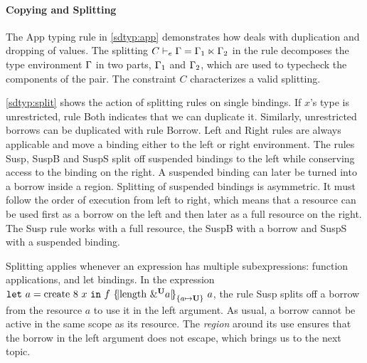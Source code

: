 \paragraph{Copying and Splitting}
\label{sdtyping:split}

The {\sc App} typing rule in \cref{sdtyp:app} demonstrates how \lang
deals with duplication and dropping of values.
The splitting $C \vdash_e \Gamma = \Gamma_1 \ltimes \Gamma_2$ in the rule decomposes the
type environment $\Gamma$ in two parts, $\Gamma_1$ and $\Gamma_2$, which are used
to typecheck the components of the pair.
The constraint $C$ characterizes a valid  splitting.

\cref{sdtyp:split} shows the action of splitting rules on single
bindings. If $x$'s type is unrestricted, 
rule {\sc Both} indicates that we can duplicate it.
Similarly, unrestricted borrows can be duplicated with rule
{\sc Borrow}.
{\sc Left} and {\sc Right} rules are always applicable and move a binding
either to the left or right environment.
The rules {\sc Susp}, {\sc SuspB} and {\sc SuspS}
split off suspended bindings to
the left while conserving access to the binding on the right.
A suspended binding can later be turned
into a borrow inside a region. Splitting of suspended bindings is
asymmetric. It must follow the order of execution from left to right,
which means that a resource can be used first as a borrow on the left
and then later as a full resource on the right. The {\sc Susp} rule
works with a full resource, the {\sc SuspB}
with a borrow and {\sc SuspS} with a suspended binding.

Splitting applies whenever an
expression has multiple subexpressions:  function applications,
and let bindings. In the
expression
$\letin{a}{\text{create}\ 8\ x}
{f\ \region[{}]{\Sone a\IBORROW}{\text{length}\ \borrow[\IBORROW]{a}}\ a}$,
the rule {\sc Susp} splits off a borrow from  the resource
$a$ to use it in the left argument.
As usual, a borrow cannot be active in the same scope as its resource.
The \emph{region} around its use ensures that the borrow in the left argument
does not
escape, which brings us to the next topic.




